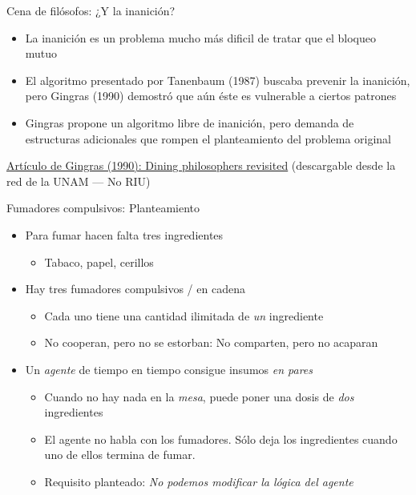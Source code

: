 \documentclass[presentation]{beamer}
\begin{document}
\begin{frame}[label={sec:org7173123}]{Cena de filósofos: ¿Y la inanición?}
\begin{itemize}
\item La inanición es un problema mucho más dificil de tratar que el
bloqueo mutuo
\item El algoritmo presentado por Tanenbaum (1987) buscaba prevenir la
inanición, pero Gingras (1990) demostró que aún éste es vulnerable a
ciertos patrones
\item Gingras propone un algoritmo libre de inanición, pero demanda de
estructuras adicionales que rompen el planteamiento del problema
original
\end{itemize}
\begin{center}
\href{https://dl.acm.org/citation.cfm?id\%3D101091}{Artículo de Gingras (1990): Dining philosophers revisited} (descargable
desde la red de la UNAM — No RIU)
\end{center}
\end{frame}

\begin{frame}[label={sec:org20a2701}]{Fumadores compulsivos: Planteamiento}
\begin{itemize}
\item Para fumar hacen falta tres ingredientes
\begin{itemize}
\item Tabaco, papel, cerillos
\end{itemize}
\item Hay tres fumadores compulsivos / en cadena
\begin{itemize}
\item Cada uno tiene una cantidad ilimitada de \emph{un} ingrediente
\item No cooperan, pero no se estorban: No comparten, pero no acaparan
\end{itemize}
\item Un \emph{agente} de tiempo en tiempo consigue insumos \emph{en pares}
\begin{itemize}
\item Cuando no hay nada en la \emph{mesa}, puede poner una dosis de \emph{dos}
ingredientes
\item El agente no habla con los fumadores. Sólo deja los ingredientes
cuando uno de ellos termina de fumar.
\item Requisito planteado: \emph{No podemos modificar la lógica del agente}
\end{itemize}
\end{itemize}
\end{frame}
\end{document}
